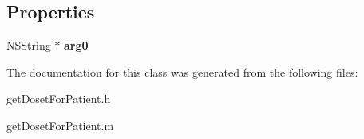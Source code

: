 \subsection*{Properties}
\begin{DoxyCompactItemize}
\item 
\hypertarget{interfaceget_doset_for_patient_a88044ce53b507c42fe912e5a5951af08}{}N\+S\+String $\ast$ {\bfseries arg0}\label{interfaceget_doset_for_patient_a88044ce53b507c42fe912e5a5951af08}

\end{DoxyCompactItemize}


The documentation for this class was generated from the following files\+:\begin{DoxyCompactItemize}
\item 
get\+Doset\+For\+Patient.\+h\item 
get\+Doset\+For\+Patient.\+m\end{DoxyCompactItemize}
